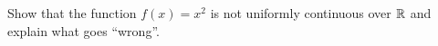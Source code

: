 \begin{exercise}
  \label{ex:hw05:square-not-uniformly-continuous}
  Show that the function $f(x)=x^2$ is not uniformly continuous over
  $\mathbb{R}$ and explain what goes ``wrong''.
\end{exercise}
